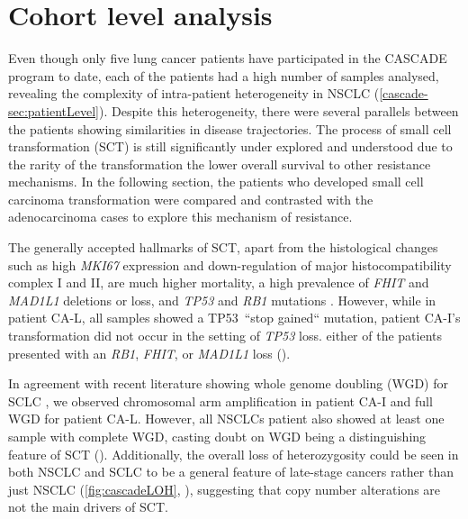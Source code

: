 

\section{Cohort level analysis}
\label{cascade-sec:cohortLevel}

Even though  only five lung cancer patients  have participated in the CASCADE program to date, each of the patients had a high number of samples analysed, revealing the complexity of intra-patient heterogeneity in NSCLC (\autoref{cascade-sec:patientLevel}). Despite this heterogeneity, there were several parallels between the patients showing similarities in disease trajectories. The process of small cell transformation (SCT) is still significantly under explored and understood due to the rarity of the transformation  the lower overall survival  to other resistance mechanisms. In the following section, the patients who developed small cell carcinoma transformation were compared and contrasted with the adenocarcinoma cases to  explore this mechanism of resistance.

The generally accepted hallmarks of SCT, apart from the histological changes such as high \textit{MKI67} expression and down-regulation of major histocompatibility complex I and II, are  much higher mortality, a high prevalence of \textit{FHIT} and \textit{MAD1L1} deletions or loss, and \textit{TP53} and \textit{RB1} mutations \cite{Meerbeeck2011,Raso2021}. However, while in patient CA-L, all samples showed a TP53~``stop gained`` mutation, patient CA-I's transformation did not occur in the setting of  \textit{TP53} loss. either of the patients presented with an \textit{RB1}, \textit{FHIT}, or \textit{MAD1L1} loss (). 

In agreement with recent literature showing whole genome doubling (WGD) for SCLC \cite{Zhou2021}, we observed chromosomal arm amplification in patient CA-I and full WGD for patient CA-L. However, all NSCLCs patient also showed at least one sample with complete WGD, casting doubt on WGD being a distinguishing feature of SCT (). Additionally, the overall loss of heterozygosity could be seen in both NSCLC and SCLC to be a general feature of late-stage cancers rather than just NSCLC (\autoref{fig:cascadeLOH}, \cite{Girish2023}), suggesting that copy number alterations are not the main drivers of SCT.

